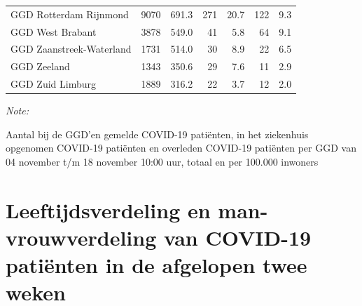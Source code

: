 \documentclass[
  english,
  man,floatsintext]{apa6}
\begin{document}
\begin{table}[H]
\begin{threeparttable}
\begin{tabular}{lrrrrrr}
GGD Rotterdam Rijnmond & 9070 & 691.3 & 271 & 20.7 & 122 & 9.3\\
GGD West Brabant & 3878 & 549.0 & 41 & 5.8 & 64 & 9.1\\
GGD Zaanstreek-Waterland & 1731 & 514.0 & 30 & 8.9 & 22 & 6.5\\
GGD Zeeland & 1343 & 350.6 & 29 & 7.6 & 11 & 2.9\\
GGD Zuid Limburg & 1889 & 316.2 & 22 & 3.7 & 12 & 2.0\\
\bottomrule
\end{tabular}
\begin{tablenotes}
\item \textit{Note: } 
\item Aantal bij de GGD’en gemelde COVID-19 patiënten, in het ziekenhuis opgenomen COVID-19 patiënten en overleden COVID-19 patiënten per GGD van 04 november t/m 18 november 10:00 uur, totaal en per 100.000 inwoners
\end{tablenotes}
\end{threeparttable}
\endgroup{}
\end{table}

\newpage

\hypertarget{leeftijdsverdeling-en-man-vrouwverdeling-van-covid-19-patiuxebnten-in-de-afgelopen-twee-weken}{%
\section{Leeftijdsverdeling en man-vrouwverdeling van COVID-19 patiënten in de afgelopen twee weken}\label{leeftijdsverdeling-en-man-vrouwverdeling-van-covid-19-patiuxebnten-in-de-afgelopen-twee-weken}}
\end{document}
